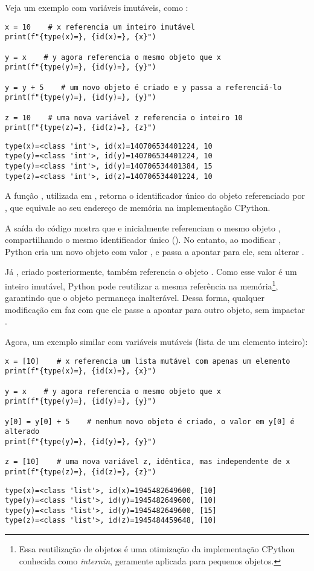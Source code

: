 Veja um exemplo com variáveis imutáveis, como :
\begin{verbatim}
x = 10    # x referencia um inteiro imutável
print(f"{type(x)=}, {id(x)=}, {x}")

y = x    # y agora referencia o mesmo objeto que x
print(f"{type(y)=}, {id(y)=}, {y}")

y = y + 5    # um novo objeto é criado e y passa a referenciá-lo
print(f"{type(y)=}, {id(y)=}, {y}")

z = 10    # uma nova variável z referencia o inteiro 10
print(f"{type(z)=}, {id(z)=}, {z}")
\end{verbatim}
\begin{verbatim}
type(x)=<class 'int'>, id(x)=140706534401224, 10
type(y)=<class 'int'>, id(y)=140706534401224, 10
type(y)=<class 'int'>, id(y)=140706534401384, 15
type(z)=<class 'int'>, id(z)=140706534401224, 10
\end{verbatim}

A função , utilizada em , retorna o identificador único do objeto referenciado
por , que equivale ao seu endereço de memória na implementação CPython.

A saída do código mostra que  e  inicialmente referenciam o mesmo objeto ,
compartilhando o mesmo identificador único (). No entanto, ao modificar , Python cria um novo
objeto com valor , e  passa a apontar para ele, sem alterar .


Já , criado posteriormente, também referencia o objeto .
Como esse valor é um inteiro imutável, Python pode reutilizar a mesma referência na
memória\footnote{Essa reutilização de objetos é uma otimização da implementação CPython conhecida como
\emph{internin}, geramente aplicada para pequenos objetos.}, garantindo que o
objeto permaneça inalterável.
Dessa forma, qualquer modificação em  faz com que ele passe a apontar para outro objeto, sem
impactar .


Agora, um exemplo similar com variáveis mutáveis (lista de um elemento inteiro):
\begin{verbatim}
x = [10]    # x referencia um lista mutável com apenas um elemento
print(f"{type(x)=}, {id(x)=}, {x}")

y = x    # y agora referencia o mesmo objeto que x
print(f"{type(y)=}, {id(y)=}, {y}")

y[0] = y[0] + 5    # nenhum novo objeto é criado, o valor em y[0] é alterado
print(f"{type(y)=}, {id(y)=}, {y}")

z = [10]    # uma nova variável z, idêntica, mas independente de x
print(f"{type(z)=}, {id(z)=}, {z}")
\end{verbatim}
\begin{verbatim}
type(x)=<class 'list'>, id(x)=1945482649600, [10]
type(y)=<class 'list'>, id(y)=1945482649600, [10]
type(y)=<class 'list'>, id(y)=1945482649600, [15]
type(z)=<class 'list'>, id(z)=1945484459648, [10]
\end{verbatim}

